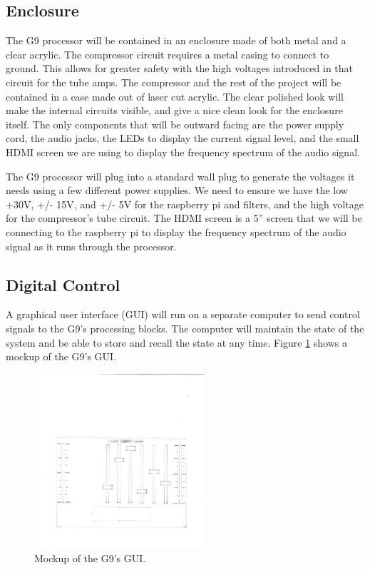 \documentclass[journal]{IEEEtran}
\begin{document}
	\subsection{Enclosure}
	The G9 processor will be contained in an enclosure made of both metal and a clear acrylic.  The compressor circuit requires a metal casing to connect to ground.  This allows for greater safety with the high voltages introduced in that circuit for the tube amps.  The compressor and the rest of the project will be contained in a case made out of laser cut acrylic.  The clear polished look will make the internal circuits visible, and give a nice clean look for the enclosure itself.  The only components that will be outward facing are the power supply cord, the audio jacks, the LEDs to display the current signal level, and the small HDMI screen we are using to display the frequency spectrum of the audio signal.  
	
	The G9 processor will plug into a standard wall plug to generate the voltages it needs using a few different power supplies.  We need to ensure we have the low +30V, +/- 15V,  and +/- 5V for the raspberry pi and filters, and the high voltage for the compressor’s tube circuit.  The HDMI screen is a 5” screen that we will be connecting to the raspberry pi to display the frequency spectrum of the audio signal as it runs through the processor.  
	
	
	
	\subsection{Digital Control}
	A graphical user interface (GUI) will run on a separate computer to send control signals to the G9's processing blocks. The computer will maintain the state of the system and be able to store and recall the state at any time. Figure \ref{fig:gui} shows a mockup of the G9's GUI.
	
	\begin{figure}
		\centering
		\includegraphics[width=2.5in]{gui}
		\caption{Mockup of the G9's GUI. }
		\label{fig:gui}
	\end{figure}
	
\end{document}

